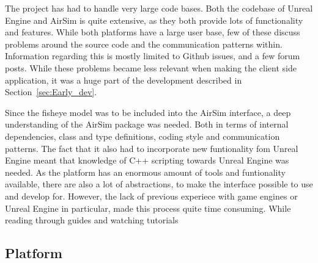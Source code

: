 The project has had to handle very large code bases. Both the codebase of Unreal Engine and AirSim is quite extensive, as they both provide lots of functionality and features. While both platforms have a large user base, few of these discuss problems around the source code and the communication patterns within. Information regarding this is mostly limited to Github issues, and a few forum posts. While these problems became less relevant when making the client side application, it was a huge part of the development described in Section~\ref{sec:Early_dev}. 

Since the fisheye model was to be included into the AirSim interface, a deep understanding of the AirSim package was needed. Both in terms of internal dependencies, class and type definitions, coding style and communication patterns. The fact that it also had to incorporate new funtionality fom Unreal Engine meant that knowledge of C++ scripting towards Unreal Engine was needed. As the platform has an enormous amount of tools and funtionality available, there are also a lot of abstractions, to make the interface possible to use and develop for. However, the lack of previous experiece with game engines or Unreal Engine in particular, made this process quite time consuming. While reading through guides and watching tutorials

\subsection{Platform}





